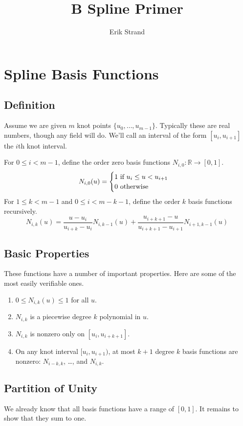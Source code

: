 \documentclass[11pt, oneside]{article}   	%
\title{B Spline Primer}
\author{Erik Strand}
\begin{document}
\maketitle

\section{Spline Basis Functions}

\subsection{Definition}
Assume we are given $m$ knot points $\{u_0, \ldots, u_{m-1}\}$. Typically these are real numbers, though any field will do. We'll call an interval of the form $[u_i, u_{i+1}]$ the $i$th knot interval.

For $0 \leq i < m - 1$, define the order zero basis functions $N_{i, 0} : \mathbb{R} \rightarrow [0, 1]$.
\begin{equation}
N_{i, 0} (u) =
\begin{cases}
1 $ if $ u_i \leq u < u_{i+1} \\
0 $ otherwise$
\end{cases}
\end{equation}
For $1 \leq k < m - 1$ and $0 \leq i < m - k - 1$, define the order $k$ basis functions recursively.
\begin{equation}
N_{i, k} (u) = \frac{u - u_i}{u_{i+k} - u_i} N_{i, k-1} (u) + \frac{u_{i+k+1} - u}{u_{i+k+1} - u_{i+1}} N_{i+1, k-1} (u)
\end{equation}

\subsection{Basic Properties}
These functions have a number of important properties. Here are some of the most easily verifiable ones.
\begin{enumerate}
\item $0 \leq N_{i,k} (u) \leq 1$ for all $u$.
\item $N_{i,k}$ is a piecewise degree $k$ polynomial in $u$.
\item $N_{i,k}$ is nonzero only on $[u_i, u_{i+k+1}]$. 
\item On any knot interval $[u_i, u_{i+1})$, at most $k + 1$ degree $k$ basis functions are nonzero: $N_{i-k, k}$, \ldots, and $N_{i, k}$.
\end{enumerate}

\subsection{Partition of Unity}
We already know that all basis functions have a range of $[0, 1]$. It remains to show that they sum to one.
\end{document}
